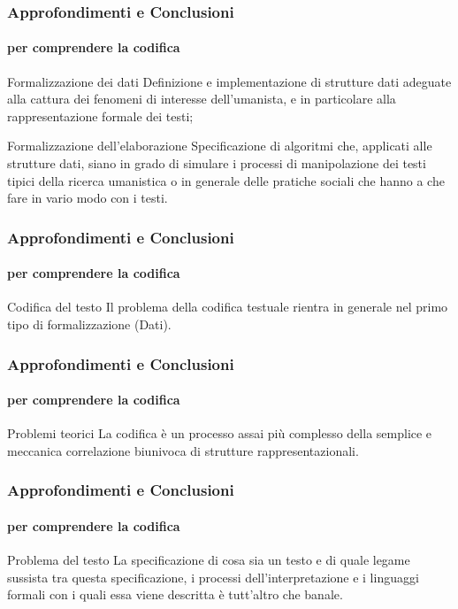 \begin{frame}
	\frametitle{Approfondimenti e Conclusioni}
	\framesubtitle{per comprendere la codifica}
	\addtocounter{nframe}{1}

	\begin{block}{Formalizzazione dei dati}
		Definizione e implementazione di strutture dati adeguate alla cattura dei fenomeni di interesse dell’umanista, e in particolare alla rappresentazione formale dei testi;
	\end{block}

	\begin{block}{Formalizzazione dell'elaborazione}
		Specificazione di algoritmi che, applicati alle strutture dati, siano in grado di simulare i processi di manipolazione dei testi tipici della ricerca umanistica o in generale delle pratiche sociali che hanno a che fare in vario modo con i testi.
	\end{block}

\end{frame}


\begin{frame}
	\frametitle{Approfondimenti e Conclusioni}
	\framesubtitle{per comprendere la codifica}
	\addtocounter{nframe}{1}

	\begin{block}{Codifica del testo}
		Il problema della codifica testuale rientra in generale nel primo tipo di formalizzazione (Dati).
	\end{block}

\end{frame}

\begin{frame}
	\frametitle{Approfondimenti e Conclusioni}
	\framesubtitle{per comprendere la codifica}
	\addtocounter{nframe}{1}

	\begin{block}{Problemi teorici}
		La codifica è un processo assai più complesso della semplice e meccanica correlazione biunivoca di strutture rappresentazionali.
	\end{block}

\end{frame}

\begin{frame}
	\frametitle{Approfondimenti e Conclusioni}
	\framesubtitle{per comprendere la codifica}
	\addtocounter{nframe}{1}

	\begin{block}{Problema del testo}
		La specificazione di cosa sia un testo e di quale legame sussista tra questa specificazione, i processi dell’interpretazione e i linguaggi formali con i quali essa viene descritta è tutt'altro che banale.
	\end{block}

\end{frame}


